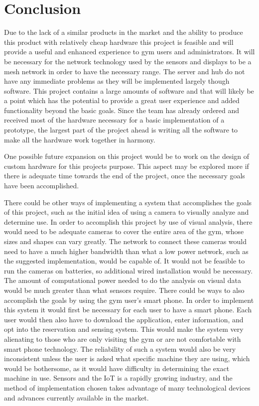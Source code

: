 \documentclass[PPFS.tex]{template/subfiles}
\begin{document}
\section{Conclusion}
Due to the lack of a similar products in the market and the ability to produce this product with relatively cheap hardware this project is feasible and will provide a useful and enhanced experience to gym users and administrators. It will be necessary for the network technology used by the sensors and displays to be a mesh network in order to have the necessary range. The server and hub do not have any immediate problems as they will be implemented largely though software. This project contains a large amounts of software and that will likely be a point which has the potential to provide a great user experience and added functionality beyond the basic goals. Since the team has already ordered and received most of the hardware necessary for a basic implementation of a prototype, the largest part of the project ahead is writing all the software to make all the hardware work together in harmony.

One possible future expansion on this project would be to work on the design of custom hardware for this projects purpose. This aspect may be explored more if there is adequate time towards the end of the project, once the necessary goals have been accomplished.

There could be other ways of implementing a system that accomplishes the goals of this project, such as the initial idea of using a camera to visually analyze and determine use. In order to accomplish this project by use of visual analysis, there would need to be adequate cameras to cover the entire area of the gym, whose sizes and shapes can vary greatly. The network to connect these cameras would need to have a much higher bandwidth than what a low power network, such as the suggested implementation, would be capable of. It would not be feasible to run the cameras on batteries, so additional wired installation would be necessary. The amount of computational power needed to do the analysis on visual data would be much greater than what sensors require. There could be ways to also accomplish the goals by using the gym user's smart phone. In order to implement this system it would first be necessary for each user to have a smart phone. Each user would then also have to download the application, enter information, and opt into the reservation and sensing system. This would make the system very alienating to those who are only visiting the gym or are not comfortable with smart phone technology. The reliability of such a system would also be very inconsistent unless the user is asked what specific machine they are using, which would be bothersome, as it would have difficulty in determining the exact machine in use. Sensors and the IoT is a rapidly growing industry, and the method of implementation chosen takes advantage of many technological devices and advances currently available in the market.
\end{document}
